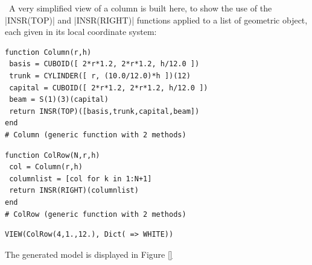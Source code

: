 \begin{coding}\
A very simplified view of a column is built here, to show the use of the |INSR(TOP)| and |INSR(RIGHT)| functions applied to a list of geometric object, each given in its local coordinate system:
\begin{lstlisting}[language=JuliaLocal, style=julia, mathescape=true]
function Column(r,h)
 basis = CUBOID([ 2*r*1.2, 2*r*1.2, h/12.0 ]) 
 trunk = CYLINDER([ r, (10.0/12.0)*h ])(12)
 capital = CUBOID([ 2*r*1.2, 2*r*1.2, h/12.0 ])
 beam = S(1)(3)(capital) 
 return INSR(TOP)([basis,trunk,capital,beam])
end
# Column (generic function with 2 methods)
\end{lstlisting}

\begin{lstlisting}[language=JuliaLocal, style=julia, mathescape=true]
function ColRow(N,r,h)
 col = Column(r,h)
 columnlist = [col for k in 1:N+1]
 return INSR(RIGHT)(columnlist)
end
# ColRow (generic function with 2 methods)
\end{lstlisting}

\begin{lstlisting}[language=JuliaLocal, style=julia, mathescape=true]
VIEW(ColRow(4,1.,12.), Dict( => WHITE))
\end{lstlisting}
The generated model is displayed in Figure \ref{}
\end{coding}



